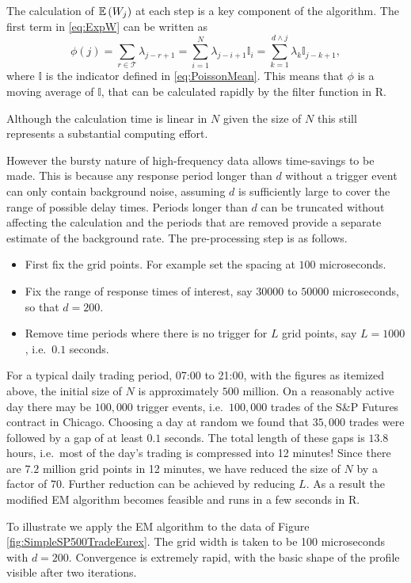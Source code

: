The calculation of $\mathbb{E}\,(W_j)$ at each step is a key component of the algorithm. The first term in \eqref{eq:ExpW} can be written as 
$$\phi(j) = \sum_{r \in\mathcal{T}} \lambda_{j-r+1} = \sum_{i=1}^N \lambda_{j-i+1} \mathbb{I}_i = \sum_{k=1}^{d \wedge j} \lambda_k \mathbb{I}_{j-k+1},$$
where $\mathbb{I}$ is the indicator defined in \eqref{eq:PoissonMean}.  This means that $\phi$ is a moving average of $\mathbb{I}$, that can be calculated rapidly by the {\sf filter} function in {\sf R}. 

Although the calculation time is linear in $N$ given the size of $N$ this still represents a substantial computing effort. 

However the bursty nature of high-frequency data allows time-savings to be made. This is because any response period longer than $d$ without a trigger event can only contain background noise, assuming $d$ is sufficiently large to cover the range of possible delay times.  Periods longer than $d$ can be truncated without affecting the calculation and the periods that are removed provide a separate estimate of the background rate.    
The pre-processing step is as follows. 
\begin{itemize}
\item[(a)] First fix the grid points. For example set the spacing at $100$ microseconds.     
\item[(b)] Fix the range of response times of interest, say $30000$ to $50000$ microseconds, so that $d = 200$.
\item[(c)] Remove time periods where there is no trigger for $L$ grid points, say $L=1000$, i.e.\  $0.1$  seconds.
\end{itemize}
For a typical daily trading period, 07:00 to 21:00, with the figures as itemized above, the initial size of $N$ is approximately $500$ million. On a reasonably active day there may be $100,000$ trigger events, i.e.\  $100,000$ trades of the S\&P Futures contract in Chicago. Choosing a day at random we found that $35,000$ trades were followed by a gap of at least $0.1$ seconds. The total length of these gaps is $13.8$ hours, i.e.\ most of the day's trading is compressed into 12 minutes! Since there are $7.2$ million grid points in 12 minutes, we have reduced the size of $N$ by a factor of $70$. Further reduction can be achieved by reducing $L$. As a result the modified EM algorithm becomes feasible and runs in a few seconds in {\sf R}.

To illustrate we apply the EM algorithm to the data of Figure \ref{fig:SimpleSP500TradeEurex}. The grid width is taken to be 100 microseconds with $d = 200$. Convergence is extremely rapid, with the basic shape of the profile visible after two iterations. 

